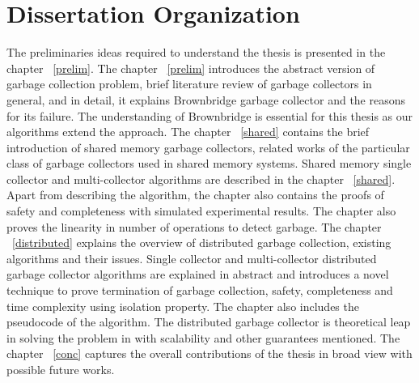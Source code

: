 \section{Dissertation Organization}
\label{intro:do}
The preliminaries ideas required to understand the thesis is presented in the chapter ~\ref{prelim}. The chapter ~\ref{prelim} introduces the abstract version of garbage collection problem, brief literature review of garbage collectors in general, and in detail, it explains Brownbridge garbage collector and the reasons for its failure. The understanding of Brownbridge is essential for this thesis as our algorithms extend the approach. The chapter ~\ref{shared} contains the brief introduction of shared memory garbage collectors, related works of the particular class of garbage collectors used in shared memory systems. Shared memory single collector and multi-collector algorithms are described in the chapter ~\ref{shared}. Apart from describing the algorithm, the chapter also contains the proofs of safety and completeness with simulated experimental results. The chapter also proves the linearity in number of operations to detect garbage. The chapter ~\ref{distributed} explains the overview of distributed garbage collection, existing algorithms and their issues. Single collector and multi-collector distributed garbage collector algorithms are explained in abstract and introduces a novel technique to prove termination of garbage collection, safety, completeness and time complexity using isolation property. The chapter also includes the pseudocode of the algorithm. The distributed garbage collector is theoretical leap in solving the problem in with scalability and other guarantees mentioned. The chapter ~\ref{conc} captures the overall contributions of the thesis in broad view with possible future works.